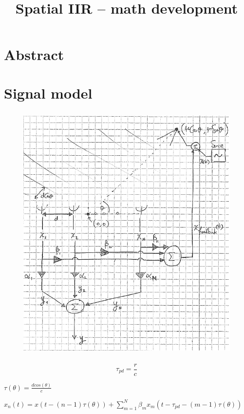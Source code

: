 \documentclass[a4paper,12pt]{report}
\title{Spatial IIR – math development}
\begin{document}
\maketitle
\sloppy 
 \par
\noindent 
\section*{Abstract}
 \par
\noindent 
\section*{Signal model}
 \par
\noindent 
\begin{center}



\begin{figure}[H]
\begin{center}
\includegraphics[width=4.57in,height=5.18in]{./Media/image1.png}
\end{center}
\end{figure}




\end{center}\vspace{12pt}
\vspace{12pt}
\noindent 
$$  \tau_{pd}=\frac{r}{c} $$
 \par
\noindent 
$  \tau \left(  \theta  \right) =\frac{dcos \left(  \theta  \right) }{c} $
 \par
\noindent 
$ x_{n} \left( t \right) =x \left( t- \left( n-1 \right)  \tau \left(  \theta  \right)  \right) + \sum _{m=1}^{N} \beta _{m}x_{m} \left( t- \tau_{pd}- \left( m-1 \right)  \tau \left(  \theta  \right)  \right)  $
 \par
\noindent 
\end{document}
